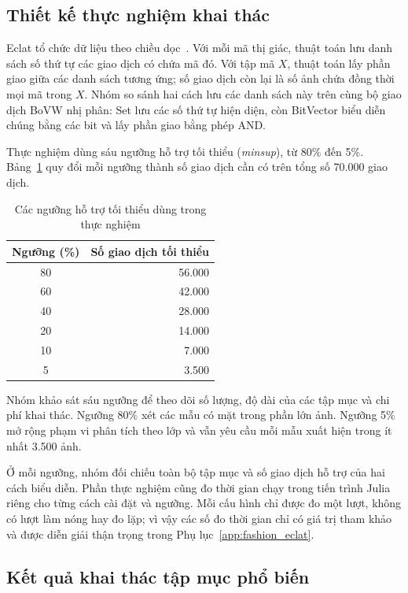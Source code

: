 \subsection{Thiết kế thực nghiệm khai thác}

Eclat tổ chức dữ liệu theo chiều dọc~\cite{Zaki2000}. Với mỗi mã thị giác, thuật toán lưu danh sách số thứ tự các giao dịch có chứa mã đó. Với tập mã $X$, thuật toán lấy phần giao giữa các danh sách tương ứng; số giao dịch còn lại là số ảnh chứa đồng thời mọi mã trong $X$. Nhóm so sánh hai cách lưu các danh sách này trên cùng bộ giao dịch BoVW nhị phân: Set lưu các số thứ tự hiện diện, còn BitVector biểu diễn chúng bằng các bit và lấy phần giao bằng phép AND.

Thực nghiệm dùng sáu ngưỡng hỗ trợ tối thiểu (\textit{minsup}), từ 80\% đến 5\%. Bảng~\ref{tab:fim_minsup} quy đổi mỗi ngưỡng thành số giao dịch cần có trên tổng số 70.000 giao dịch.

\begin{table}[!t]
    \centering
    \caption{Các ngưỡng hỗ trợ tối thiểu dùng trong thực nghiệm}
    \label{tab:fim_minsup}
    \begin{tabular}{c r}
        \hline
        \textbf{Ngưỡng (\%)} & \textbf{Số giao dịch tối thiểu} \\
        \hline
        80 & 56.000 \\
        60 & 42.000 \\
        40 & 28.000 \\
        20 & 14.000 \\
        10 &  7.000 \\
         5 &  3.500 \\
        \hline
    \end{tabular}
\end{table}

Nhóm khảo sát sáu ngưỡng để theo dõi số lượng, độ dài của các tập mục và chi phí khai thác. Ngưỡng 80\% xét các mẫu có mặt trong phần lớn ảnh. Ngưỡng 5\% mở rộng phạm vi phân tích theo lớp và vẫn yêu cầu mỗi mẫu xuất hiện trong ít nhất 3.500 ảnh.

Ở mỗi ngưỡng, nhóm đối chiếu toàn bộ tập mục và số giao dịch hỗ trợ của hai cách biểu diễn. Phần thực nghiệm cũng đo thời gian chạy trong tiến trình Julia riêng cho từng cách cài đặt và ngưỡng. Mỗi cấu hình chỉ được đo một lượt, không có lượt làm nóng hay đo lặp; vì vậy các số đo thời gian chỉ có giá trị tham khảo và được diễn giải thận trọng trong Phụ lục~\ref{app:fashion_eclat}.

\subsection{Kết quả khai thác tập mục phổ biến}
\label{subsec:fashion_fim_results}

